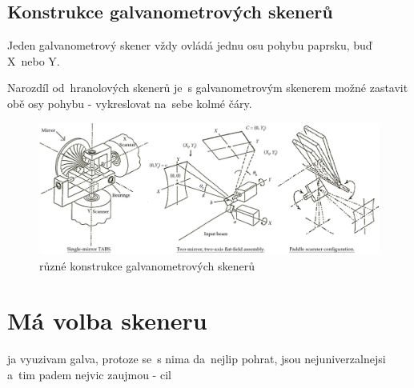 \subsection{Konstrukce galvanometrových skenerů\label{sec:galvo-scanner-construction}}
Jeden galvanometrový skener vždy ovládá jednu osu pohybu paprsku, buď X~nebo Y.

Narozdíl od~hranolových skenerů je~s galvanometrovým skenerem možné zastavit obě osy pohybu - vykreslovat na~sebe kolmé čáry.

\begin{figure}[!htb]
  \centering
  \includegraphics[width=1\textwidth]{img/scanner-constructions.jpg}
  \caption{\label{fig:scanner-constructions} různé konstrukce galvanometrových skenerů}
\end{figure}

\section{Má volba skeneru}
ja vyuzivam galva, protoze se~s nima da~nejlip pohrat, jsou nejuniverzalnejsi a~tim padem nejvic zaujmou - cil